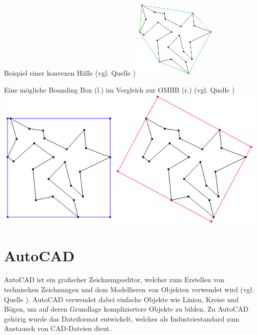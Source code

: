 \begin{Bild}{Beispiel einer konvexen Hülle (vgl. Quelle \cite{ombb})}
	\includegraphics[width = 150px]{Bilder/convex_hull}
\end{Bild}
\begin{Bild}{Eine mögliche Bounding Box (l.) im Vergleich zur OMBB (r.) (vgl. Quelle \cite{ombb})}
	\includegraphics[width = \textwidth]{Bilder/aabb_vs_ombb}
\end{Bild}

\section{AutoCAD}
AutoCAD ist ein grafischer Zeichnungseditor, welcher zum Erstellen von technischen Zeichnungen und dem Modellieren von Objekten verwendet wird (vgl. Quelle \cite{autocadwiki}).
AutoCAD verwendet dabei einfache Objekte wie Linien, Kreise und Bögen, um auf deren Grundlage kompliziertere Objekte zu bilden.
Zu AutoCAD gehörig wurde das Dateiformat  entwickelt, welches als Industriestandard zum Austausch von CAD-Dateien dient. \\

